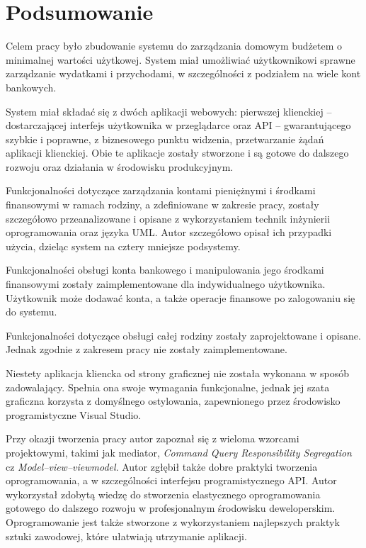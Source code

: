 \chapter{Podsumowanie}
\label{chap:podsumowanie}

Celem pracy było zbudowanie systemu do zarządzania domowym budżetem o minimalnej wartości użytkowej. System miał umożliwiać użytkownikowi sprawne zarządzanie wydatkami i przychodami, w szczególności z podziałem na wiele kont bankowych.

System miał składać się z dwóch aplikacji webowych: pierwszej klienckiej -- dostarczającej interfejs użytkownika w przeglądarce oraz API -- gwarantującego szybkie i poprawne, z biznesowego punktu widzenia, przetwarzanie żądań aplikacji klienckiej. Obie te aplikacje zostały stworzone i są gotowe do dalszego rozwoju oraz działania w środowisku produkcyjnym. 

Funkcjonalności dotyczące zarządzania kontami pieniężnymi i środkami finansowymi w ramach rodziny, a zdefiniowane w zakresie pracy, zostały szczegółowo przeanalizowane i opisane z wykorzystaniem technik inżynierii oprogramowania oraz języka UML. Autor szczegółowo opisał ich przypadki użycia, dzieląc system na cztery mniejsze podsystemy.

Funkcjonalności obsługi konta bankowego i manipulowania jego środkami finansowymi zostały zaimplementowane dla indywidualnego użytkownika. Użytkownik może dodawać konta, a także operacje finansowe po zalogowaniu się do systemu.

Funkcjonalności dotyczące obsługi całej rodziny zostały zaprojektowane i opisane. Jednak zgodnie z zakresem pracy nie zostały zaimplementowane.

Niestety aplikacja kliencka od strony graficznej nie została wykonana w sposób zadowalający. Spełnia ona swoje wymagania funkcjonalne, jednak jej szata graficzna korzysta z domyślnego ostylowania, zapewnionego przez środowisko programistyczne Visual Studio.

Przy okazji tworzenia pracy autor zapoznał się z wieloma wzorcami projektowymi, takimi jak mediator, \emph{Command Query Responsibility Segregation} cz \emph{Model–view–viewmodel}. Autor zgłębił także dobre praktyki tworzenia oprogramowania, a w szczególności interfejsu programistycznego API. Autor wykorzystał zdobytą wiedzę do stworzenia elastycznego oprogramowania gotowego do dalszego rozwoju w profesjonalnym środowisku deweloperskim. Oprogramowanie jest także stworzone z wykorzystaniem najlepszych praktyk sztuki zawodowej, które ułatwiają utrzymanie aplikacji.

